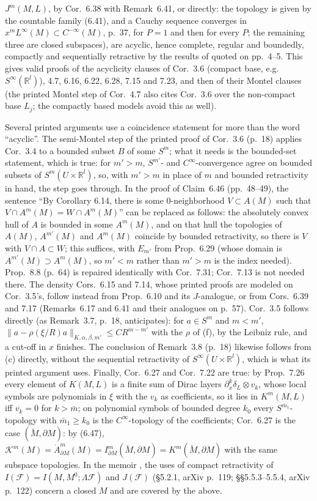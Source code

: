 \documentclass[11pt]{article}
\newcommand{\R}{\mathbb{R}}
\newcommand{\Mb}{\breve{M}}
\begin{document}
$J^m(M,L)$, by Cor.~6.38 with Remark~6.41, or directly: the topology is given by the countable family (6.41), and a Cauchy sequence converges in $x^mL^\infty(M)\subset C^{-\infty}(M)$, p.~37, for $P=1$ and then for every $P$; the remaining three are closed subspaces), are acyclic, hence complete, regular and boundedly, compactly and sequentially retractive by the results of \cite{Wen03} quoted on pp.~4--5. This gives valid proofs of the acyclicity clauses of Cor.~3.6 (compact base, e.g.\ $S^\infty(\R^l)$), 4.7, 6.16, 6.22, 6.28, 7.15 and 7.23, and then of their Montel clauses (the printed Montel step of Cor.~4.7 also cites Cor.~3.6 over the non-compact base $L_j$; the compactly based models avoid this as well).

Several printed arguments use a coincidence statement for more than the word ``acyclic''. The semi-Montel step of the printed proof of Cor.~3.6 (p.~18) applies Cor.~3.4 to a bounded subset $B$ of some $S^m$; what it needs is the bounded-set statement, which is true: for $m'>m$, $S^{m'}$- and $C^\infty$-convergence agree on bounded subsets of $S^m(U\times\R^l)$, so, with $m'>m$ in place of $m$ and bounded retractivity in hand, the step goes through. In the proof of Claim~6.46 (pp.~48--49), the sentence ``By Corollary 6.14, there is some 0-neighborhood $V\subset A(M)$ such that $V\cap A^m(M)=W\cap A^m(M)$'' can be replaced as follows: the absolutely convex hull of $A$ is bounded in some $A^m(M)$, and on that hull the topologies of $A(M)$, $A^{m'}(M)$ and $A^m(M)$ coincide by bounded retractivity, so there is $V$ with $V\cap A\subset W$; this suffices, with $E_{m'}$ from Prop.~6.29 (whose domain is $A^{m'}(M)\supset A^m(M)$, so $m'<m$ rather than $m'>m$ is the index needed). Prop.~8.8 (p.~64) is repaired identically with Cor.~7.31; Cor.~7.13 is not needed there. The density Cors.~6.15 and 7.14, whose printed proofs are modeled on Cor.~3.5's, follow instead from Prop.~6.10 and its $J$-analogue, or from Cors.~6.39 and 7.17 (Remarks~6.17 and 6.41 and their analogues on p.~57). Cor.~3.5 follows directly (as Remark~3.7, p.~18, anticipates): for $a\in S^m$ and $m<m'$, $\|a-\rho(\xi/R)a\|_{K,\alpha,\beta,m'}\le CR^{m-m'}$ with the $\rho$ of (f), by the Leibniz rule, and a cut-off in $x$ finishes. The conclusion of Remark~3.8 (p.~18) likewise follows from (c) directly, without the sequential retractivity of $S^\infty(U\times\R^l)$, which is what its printed argument uses. Finally, Cor.~6.27 and Cor.~7.22 are true: by Prop.~7.26 every element of $K(M,L)$ is a finite sum of Dirac layers $\partial_x^k\delta_L\otimes v_k$, whose local symbols are polynomials in $\xi$ with the $v_k$ as coefficients, so it lies in $K^m(M,L)$ iff $v_k=0$ for $k>\bar m$; on polynomial symbols of bounded degree $k_0$ every $S^{\bar m_1}$-topology with $\bar m_1\ge k_0$ is the $C^\infty$-topology of the coefficients; Cor.~6.27 is the case $(\Mb,\partial M)$: by (6.47), $\mathcal K^m(M)=\dot A^m_{\partial M}(M)=I^m_{\partial M}(\Mb,\partial M)=K^m(\Mb,\partial M)$ with the same subspace topologies. In the memoir \cite{ALKL24m}, the uses of compact retractivity of $I(\mathcal F)=I(M,M^0;\Lambda\mathcal F)$ and $J(\mathcal F)$ (\S5.2.1, arXiv p.~119; \S\S5.5.3--5.5.4, arXiv p.~122) concern a closed $M$ and are covered by the above.
\end{document}
